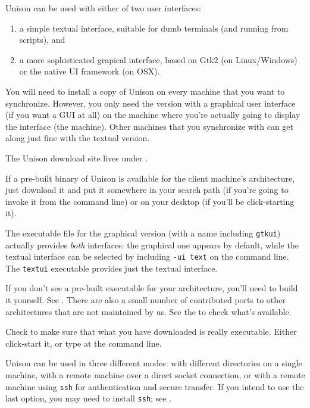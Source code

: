 \documentclass{article}
\begin{document}
Unison can be used with either of two user interfaces: 
\begin{enumerate}
\item a simple textual interface, suitable for dumb terminals (and
running from scripts), and 
\item a more sophisticated grapical interface, based on Gtk2 (on
       Linux/Windows) or the native UI framework (on OSX).  
\end{enumerate}

You will need to install a copy of Unison on every machine that you
want to synchronize.  However, you only need the version with a
graphical user interface (if you want a GUI at all) on the machine
where you're actually going to display the interface (the \CLIENT{}
machine).  Other machines that you synchronize with can get along just
fine with the textual version.



The Unison download site lives under 
.

If a pre-built binary of Unison is available for the client machine's
architecture, just download it and put it somewhere in your search
path (if you're going to invoke it from the command line) or on your
desktop (if you'll be click-starting it).

The executable file for the graphical version (with a name including
\verb|gtkui|) actually provides {\em both} interfaces: the graphical one
appears by default, while the textual interface can be selected by including
\verb|-ui text| on the command line.  The \verb|textui| executable
provides just the textual interface.

If you don't see a pre-built executable for your architecture, you'll
need to build it yourself.  See .
There are also a small number of contributed ports to other
architectures that are not maintained by us.  See the
 to check what's available.

Check to make sure that what you have downloaded is really executable.
Either click-start it, or type  at the command
line.  

Unison can be used in three different modes: with different directories on a
single machine, with a remote machine over a direct socket connection, or
with a remote machine using {\tt ssh} for authentication and secure
transfer.  If you intend to use the last option, you may need to install
{\tt ssh}; see .
\end{document}
